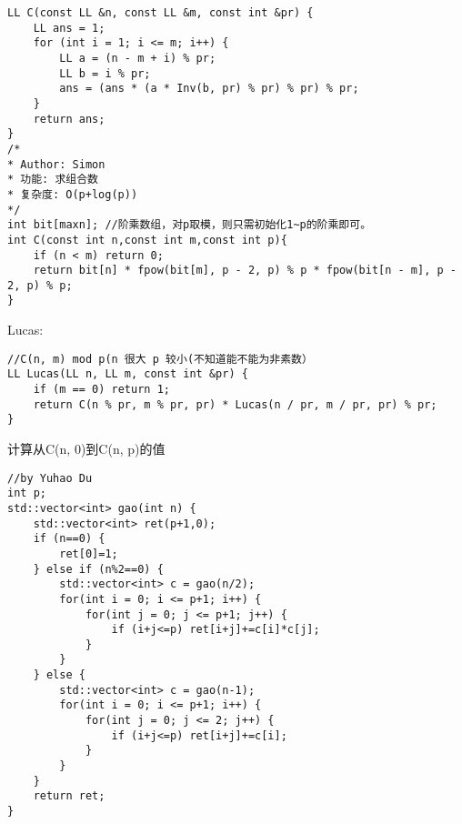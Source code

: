 \begin{lstlisting}
LL C(const LL &n, const LL &m, const int &pr) {
	LL ans = 1;
	for (int i = 1; i <= m; i++) {
		LL a = (n - m + i) % pr;
		LL b = i % pr;
		ans = (ans * (a * Inv(b, pr) % pr) % pr) % pr;
	}
	return ans;
}
/*
* Author: Simon
* 功能: 求组合数
* 复杂度: O(p+log(p))
*/
int bit[maxn]; //阶乘数组，对p取模，则只需初始化1~p的阶乘即可。
int C(const int n,const int m,const int p){
	if (n < m) return 0;
	return bit[n] * fpow(bit[m], p - 2, p) % p * fpow(bit[n - m], p - 2, p) % p; 
}
\end{lstlisting}

Lucas:
\begin{lstlisting}
//C(n, m) mod p(n 很大 p 较小(不知道能不能为非素数）
LL Lucas(LL n, LL m, const int &pr) {
	if (m == 0) return 1;
	return C(n % pr, m % pr, pr) * Lucas(n / pr, m / pr, pr) % pr;
}
\end{lstlisting}

计算从C(n, 0)到C(n, p)的值
\begin{lstlisting}
//by Yuhao Du
int p;
std::vector<int> gao(int n) {
	std::vector<int> ret(p+1,0);
	if (n==0) {
		ret[0]=1;
	} else if (n%2==0) {
		std::vector<int> c = gao(n/2);
		for(int i = 0; i <= p+1; i++) {
			for(int j = 0; j <= p+1; j++) { 
				if (i+j<=p) ret[i+j]+=c[i]*c[j];
			}
		}
	} else {
		std::vector<int> c = gao(n-1);
		for(int i = 0; i <= p+1; i++) {
			for(int j = 0; j <= 2; j++) {
				if (i+j<=p) ret[i+j]+=c[i];
			}
		}
	}
	return ret;
}
\end{lstlisting}